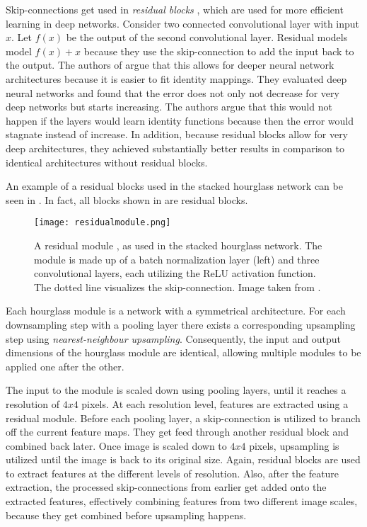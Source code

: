 Skip-connections get used in \textit{residual blocks} \cite{he_deep_2016}, which are used for more efficient learning in deep networks.
Consider two connected convolutional layer with input $x$.
Let $f(x)$ be the output of the second convolutional layer.
Residual models model $f(x) + x$ because they use the skip-connection to add the input back to the output.
The authors of \cite{he_deep_2016} argue that this allows for deeper neural network architectures because it is easier to fit identity mappings.
They evaluated deep neural networks and found that the error does not only not decrease for very deep networks but starts increasing.
The authors argue that this would not happen if the layers would learn identity functions because then the error would stagnate instead of increase.
In addition, because residual blocks allow for very deep architectures, they achieved substantially better results in comparison to identical architectures without residual blocks.

An example of a residual blocks used in the stacked hourglass network can be seen in .
In fact, all blocks shown in  are residual blocks.

\begin{figure}[htb!]
    \centering
    \texttt{[image: residualmodule.png]}
    \caption{A residual module \cite{he_deep_2016}, as used in the stacked hourglass network. The module is made up of a batch normalization layer (left) and three convolutional layers, each utilizing the ReLU activation function. The dotted line visualizes the skip-connection. Image taken from \cite{newell_stacked_2016}. }
    \label{fig:hg-residual}
\end{figure}

Each hourglass module is a network with a symmetrical architecture.
For each downsampling step with a pooling layer there exists a corresponding upsampling step using \textit{nearest-neighbour upsampling}.
Consequently, the input and output dimensions of the hourglass module are identical, allowing multiple modules to be applied one after the other.

The input to the module is scaled down using pooling layers, until it reaches a resolution of $4x4$ pixels.
At each resolution level, features are extracted using a residual module.
Before each pooling layer, a skip-connection is utilized to branch off the current feature maps.
They get feed through another residual block and combined back later.
Once image is scaled down to $4x4$ pixels, upsampling is utilized until the image is back to its original size.
Again, residual blocks are used to extract features at the different levels of resolution.
Also, after the feature extraction, the processed skip-connections from earlier get added onto the extracted features, effectively combining features from two different image scales, because they get combined before upsampling happens.

